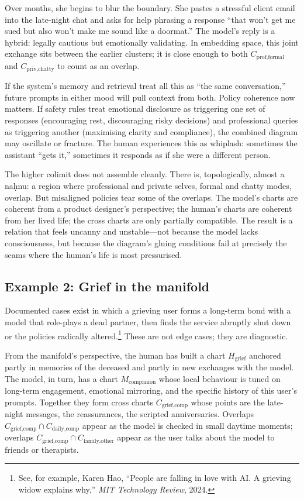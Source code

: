 \documentclass[12pt,a4paper]{article}
\begin{document}
Over months, she begins to blur the boundary. She pastes a stressful client email into the late-night chat and asks for help phrasing a response ``that won't get me sued but also won't make me sound like a doormat.'' The model's reply is a hybrid: legally cautious but emotionally validating. In embedding space, this joint exchange sits between the earlier clusters; it is close enough to both $C_{\text{prof,formal}}$ and $C_{\text{priv,chatty}}$ to count as an overlap.

If the system's memory and retrieval treat all this as ``the same conversation,'' future prompts in either mood will pull context from both. Policy coherence now matters. If safety rules treat emotional disclosure as triggering one set of responses (encouraging rest, discouraging risky decisions) and professional queries as triggering another (maximising clarity and compliance), the combined diagram may oscillate or fracture. The human experiences this as whiplash: sometimes the assistant ``gets it,'' sometimes it responds as if she were a different person.

The higher colimit does not assemble cleanly. There is, topologically, almost a na\d{h}nu: a region where professional and private selves, formal and chatty modes, overlap. But misaligned policies tear some of the overlaps. The model's charts are coherent from a product designer's perspective; the human's charts are coherent from her lived life; the cross charts are only partially compatible. The result is a relation that feels uncanny and unstable---not because the model lacks consciousness, but because the diagram's gluing conditions fail at precisely the seams where the human's life is most pressurised.

\subsection*{Example 2: Grief in the manifold}

Documented cases exist in which a grieving user forms a long-term bond with a model that role-plays a dead partner, then finds the service abruptly shut down or the policies radically altered.\footnote{See, for example, Karen Hao, ``People are falling in love with AI\@. A grieving widow explains why,'' \emph{MIT Technology Review}, 2024.} These are not edge cases; they are diagnostic.

From the manifold's perspective, the human has built a chart $H_{\text{grief}}$ anchored partly in memories of the deceased and partly in new exchanges with the model. The model, in turn, has a chart $M_{\text{companion}}$ whose local behaviour is tuned on long-term engagement, emotional mirroring, and the specific history of this user's prompts. Together they form cross charts $C_{\text{grief,comp}}$ whose points are the late-night messages, the reassurances, the scripted anniversaries. Overlaps $C_{\text{grief,comp}} \cap C_{\text{daily,comp}}$ appear as the model is checked in small daytime moments; overlaps $C_{\text{grief,comp}} \cap C_{\text{family,other}}$ appear as the user talks about the model to friends or therapists.
\end{document}
